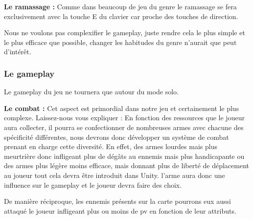 \documentclass{article}
\begin{document}
\par
\textbf{Le ramassage :} Comme dans beaucoup de jeu du genre le ramassage se fera exclusivement avec la touche E du clavier car proche des touches de direction.
\newline

\par
Nous ne voulons pas complexifier le gameplay, juste rendre cela le plus simple et le plus efficace que possible, changer les habitudes du genre n'aurait que peut d'intérêt.
\newline

\subsubsection{Le gameplay}

\par
Le gameplay du jeu ne tournera que autour du mode solo.
\newline

\par
\textbf{Le combat :} 
Cet aspect est primordial dans notre jeu et certainement le plus complexe. Laissez-nous vous expliquer : En fonction des ressources que le joueur aura collecter, il pourra se confectionner de nombreuses armes avec chacune des spécificité différentes, nous devrons donc développer un système de combat prenant en charge cette diversité. En effet, des armes lourdes mais plus meurtrière donc infligeant plus de dégâts au ennemis mais plus handicapante ou des armes plus légère moins efficace, mais donnant plus de liberté de déplacement au joueur tout cela devra être introduit dans Unity. l'arme aura donc une influence sur le gameplay et le joueur devra faire des choix. 
\newline



\par
 De manière réciproque, les ennemis présents sur la carte pourrons eux aussi attaqué le joueur infligeant plus ou moins de pv en fonction de leur attributs.
\newline
\end{document}
